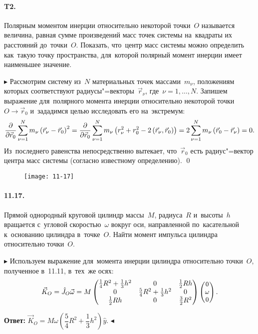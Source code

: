 \documentclass{weekly}
\begin{document}
\paragraph{T2.} Полярным моментом инерции относительно некоторой
точки~$O$ называется величина, равная сумме произведений масс
точек системы на~квадраты их расстояний до~точки~$O$.
Показать, что~центр масс системы можно определить как~такую
точку пространства, для~которой полярный момент инерции имеет
наименьшее значение.

$\blacktriangleright$ Рассмотрим систему из~$N$ материальных точек
массами~$m_\nu$, положениям которых соответствуют
радиусы"=векторы~$\vec r_\nu$, где~$\nu = 1, \ldots, N$.
Запишем выражение для~полярного момента инерции относительно
некоторой точки~$O \to \vec r_0$ и~зададимся целью исследовать его
на~экстремум:
\begin{equation}
    \frac{\partial }{\partial \vec r_0} \sum\limits_{\nu = 1}^{N} m_\nu
            \left( \vec r_\nu - \vec r_0 \right)^2
        = \frac{\partial }{\partial \vec r_0} \sum\limits_{\nu = 1}^{N} m_\nu
            \left( r_\nu^2 + r_0^2 -
            2\left(\vec r_\nu,\vec r_0\right) \right)
        = 2\sum\limits_{\nu = 1}^{N} m_\nu
            \left( \vec r_0 - \vec r_\nu \right) = 0.
\end{equation}
Из~последнего равенства непосредственно вытекает, что~$\vec r_0$
есть радиус"=вектор центра масс системы (согласно известному
определению). \qed


\begin{wrapfigure}[6]{r}{.17\textwidth}
    \vspace{-5mm}
    \texttt{[image: 11-17]}
\end{wrapfigure}
\paragraph{11.17.} Прямой однородный круговой цилиндр массы~$M$,
радиуса~$R$ и~высоты~$h$ вращается с~угловой скоростью~$\omega$
вокруг оси, направленной по~касательной к~основанию цилиндра
в~точке~$O$. Найти момент импульса цилиндра относительно точки~$O$.

$\blacktriangleright$ Используем выражение для~момента инерции цилиндра
относительно точки~$O$, полученное в~11.11, в~тех~же осях:
\begin{equation}
    \vec K_O = \hat J_O \vec\omega = M
            \begin{pmatrix}
                \frac{1}{4} R^2 + \frac{1}{3} h^2 & 0 & \frac{1}{2} Rh \\
                0 & \frac{5}{4} R^2 + \frac{1}{3} h^2 & 0 \\
                \frac{1}{2} Rh & 0 & \frac{3}{2} R^2
            \end{pmatrix}
            \small\begin{pmatrix}0\\\omega\\0\end{pmatrix}.
\end{equation}

\textbf{Ответ:} \qquad
$\vec K_O = M\omega \left(\dfrac{5}{4} R^2 + \dfrac{1}{3} h^2\right)
    \hat y$.
\hfill $\blacktriangleleft$
\end{document}
